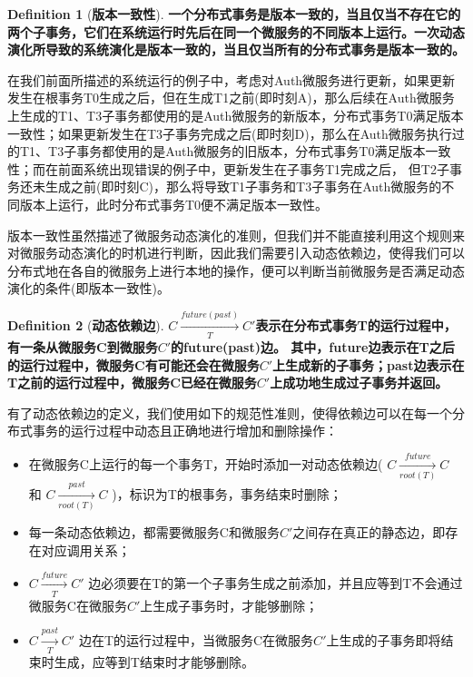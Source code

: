 \documentclass[a4paper, 12pt]{article}
\theoremstyle{definition}
\newtheorem{definition}{Definition}[section]
\begin{document}
\begin{definition}[\textbf{版本一致性}]
\label{definition:version_consistency}
\textbf{一个分布式事务是版本一致的，当且仅当不存在它的两个子事务，它们在系统运行时先后在同一个微服务的不同版本上运行。一次动态演化所导致的系统演化是版本一致的，当且仅当所有的分布式事务是版本一致的。}
\end{definition}



在我们前面所描述的系统运行的例子中，考虑对Auth微服务进行更新，如果更新发生在根事务T0生成之后，但在生成T1之前(即时刻A)，那么后续在Auth微服务上生成的T1、T3子事务都使用的是Auth微服务的新版本，分布式事务T0满足版本一致性；如果更新发生在T3子事务完成之后(即时刻D)，那么在Auth微服务执行过的T1、T3子事务都使用的是Auth微服务的旧版本，分布式事务T0满足版本一致性；而在前面系统出现错误的例子中，更新发生在子事务T1完成之后， 但T2子事务还未生成之前(即时刻C)，那么将导致T1子事务和T3子事务在Auth微服务的不同版本上运行，此时分布式事务T0便不满足版本一致性。

版本一致性虽然描述了微服务动态演化的准则，但我们并不能直接利用这个规则来对微服务动态演化的时机进行判断，因此我们需要引入动态依赖边，使得我们可以分布式地在各自的微服务上进行本地的操作，便可以判断当前微服务是否满足动态演化的条件(即版本一致性)。

\begin{definition}[\textbf{动态依赖边}]
\label{definition:dynamic_dependences}
\textbf{$C \xrightarrow[T]{future(past)}  C'$表示在分布式事务T的运行过程中，有一条从微服务C到微服务$C'$的future(past)边。
其中，future边表示在T之后的运行过程中，微服务C有可能还会在微服务$C'$上生成新的子事务；past边表示在T之前的运行过程中，微服务C已经在微服务$C'$上成功地生成过子事务并返回。}
\end{definition}



有了动态依赖边的定义，我们使用如下的规范性准则，使得依赖边可以在每一个分布式事务的运行过程中动态且正确地进行增加和删除操作：

\begin{itemize}
\item{在微服务C上运行的每一个事务T，开始时添加一对动态依赖边( $C \xrightarrow[root(T)]{future}C$ 和 $C \xrightarrow[root(T)]{past}C$ )，标识为T的根事务，事务结束时删除；}


\item{每一条动态依赖边，都需要微服务C和微服务$C'$之间存在真正的静态边，即存在对应调用关系；}


\item{$C \xrightarrow[T]{future}C'$ 边必须要在T的第一个子事务生成之前添加，并且应等到T不会通过微服务C在微服务$C'$上生成子事务时，才能够删除；}


\item{$C \xrightarrow[T]{past}C'$ 边在T的运行过程中，当微服务C在微服务$C'$上生成的子事务即将结束时生成，应等到T结束时才能够删除。}
\end{itemize}
\end{document}
